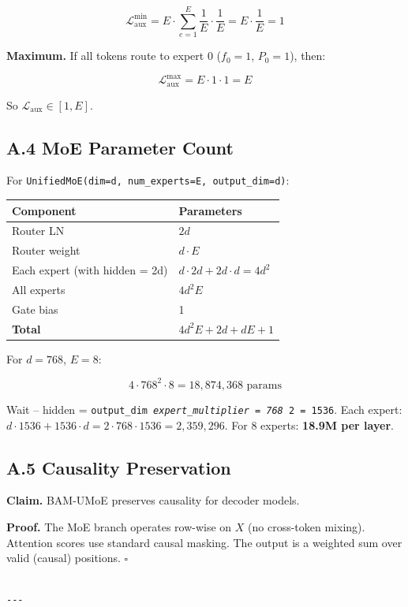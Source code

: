 \[
\mathcal{L}_\text{aux}^\text{min} = E \cdot \sum_{e=1}^{E} \frac{1}{E} \cdot \frac{1}{E} = E \cdot \frac{1}{E} = 1
\]

\textbf{Maximum.} If all tokens route to expert 0 ($f_0 = 1$, $P_0 = 1$), then:

\[
\mathcal{L}_\text{aux}^\text{max} = E \cdot 1 \cdot 1 = E
\]

So $\mathcal{L}_\text{aux} \in [1, E]$.

\subsection{A.4 MoE Parameter Count}

For \texttt{UnifiedMoE(dim=d, num\_experts=E, output\_dim=d)}:

\begin{table}[H]
\centering
\small
\begin{tabular}{ll}
\toprule
\textbf{Component} & \textbf{Parameters} \\
\midrule
Router LN & $2d$ \\
Router weight & $d \cdot E$ \\
Each expert (with hidden = 2d) & $d \cdot 2d + 2d \cdot d = 4d^2$ \\
All experts & $4d^2 E$ \\
Gate bias & 1 \\
\textbf{Total} & $4d^2 E + 2d + dE + 1$ \\
\bottomrule
\end{tabular}
\end{table}

For $d = 768$, $E = 8$: 

\[
4 \cdot 768^2 \cdot 8 = 18{,}874{,}368 \text{ params}
\]

Wait -- hidden = \texttt{output\_dim \textit{ expert\_multiplier = 768 } 2 = 1536}. Each 
expert: $d \cdot 1536 + 1536 \cdot d = 2 \cdot 768 \cdot 1536 = 2{,}359{,}296$. 
For 8 experts: \textbf{18.9M per layer}.

\subsection{A.5 Causality Preservation}

\textbf{Claim.} BAM-UMoE preserves causality for decoder models.

\textbf{Proof.} The MoE branch operates row-wise on $X$ (no cross-token mixing). 
Attention scores use standard causal masking. The output is a weighted sum 
over valid (causal) positions. $\square$
\begin{lstlisting}

---
\end{lstlisting}


